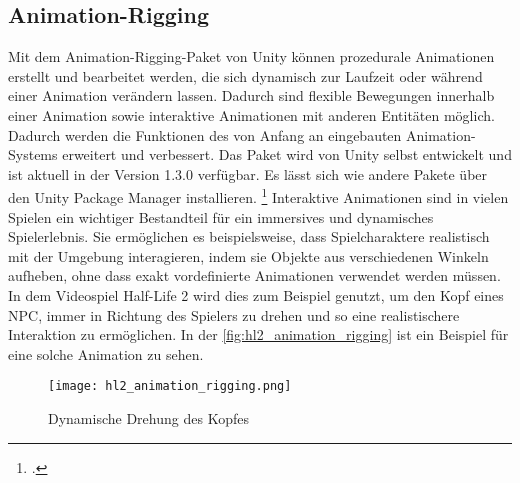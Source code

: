 \subsection{Animation-Rigging} %
Mit dem Animation-Rigging-Paket von Unity können prozedurale Animationen erstellt und bearbeitet werden, die sich dynamisch zur Laufzeit oder während einer Animation verändern lassen. Dadurch sind flexible Bewegungen innerhalb einer Animation sowie interaktive Animationen mit anderen Entitäten möglich. Dadurch werden die Funktionen des von Anfang an eingebauten Animation-Systems erweitert und verbessert. Das Paket wird von Unity selbst entwickelt und ist aktuell in der Version 1.3.0 verfügbar. Es lässt sich wie andere Pakete über den Unity Package Manager installieren. \footcite[\vglf][]{unity.animationRigging}
Interaktive Animationen sind in vielen Spielen ein wichtiger Bestandteil für ein immersives und dynamisches Spielerlebnis. Sie ermöglichen es beispielsweise, dass Spielcharaktere realistisch mit der Umgebung interagieren, indem sie Objekte aus verschiedenen Winkeln aufheben, ohne dass exakt vordefinierte Animationen verwendet werden müssen. In dem Videospiel Half-Life 2 wird dies zum Beispiel genutzt, um den Kopf eines \ac{NPC}, immer in Richtung des Spielers zu drehen und so eine realistischere Interaktion zu ermöglichen. In der \autoref{fig:hl2_animation_rigging} ist ein Beispiel für eine solche Animation zu sehen.

\begin{figure}[H]
  \caption[Dynamische Drehung des Kopfes]{Dynamische Drehung des Kopfes}\label{fig:hl2_animation_rigging}
  \texttt{[image: hl2\_animation\_rigging.png]}
\end{figure}

